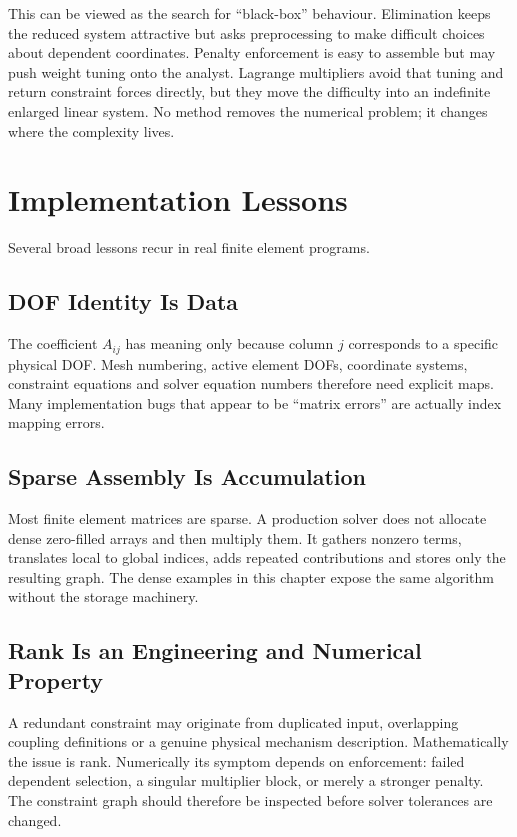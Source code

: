 \begin{notebooknote}
This can be viewed as the search for ``black-box'' behaviour. Elimination
keeps the reduced system attractive but asks preprocessing to make difficult
choices about dependent coordinates. Penalty enforcement is easy to assemble but
may push weight tuning onto the analyst. Lagrange multipliers avoid that tuning
and return constraint forces directly, but they move the difficulty into an
indefinite enlarged linear system. No method removes the numerical problem; it
changes where the complexity lives.
\end{notebooknote}

\section{Implementation Lessons}

Several broad lessons recur in real finite element programs.

\subsection{DOF Identity Is Data}

The coefficient $A_{ij}$ has meaning only because column $j$ corresponds to a
specific physical DOF. Mesh numbering, active element DOFs, coordinate systems,
constraint equations and solver equation numbers therefore need explicit maps.
Many implementation bugs that appear to be ``matrix errors'' are actually index
mapping errors.

\subsection{Sparse Assembly Is Accumulation}

Most finite element matrices are sparse. A production solver does not allocate
dense zero-filled arrays and then multiply them. It gathers nonzero terms,
translates local to global indices, adds repeated contributions and stores only
the resulting graph. The dense examples in this chapter expose the same
algorithm without the storage machinery.

\subsection{Rank Is an Engineering and Numerical Property}

A redundant constraint may originate from duplicated input, overlapping coupling
definitions or a genuine physical mechanism description. Mathematically the
issue is rank. Numerically its symptom depends on enforcement: failed dependent
selection, a singular multiplier block, or merely a stronger penalty. The
constraint graph should therefore be inspected before solver tolerances are
changed.

